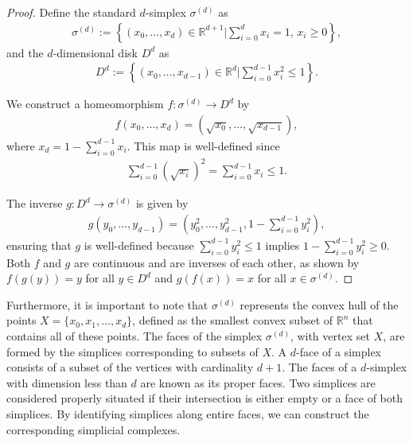 \begin{proof}
	Define the standard \( d \)-simplex \( \sigma^{(d)} \) as
	\begin{align}
		\sigma^{(d)} := \left\{(x_{0}, \ldots, x_{d}) \in \mathbb{R}^{d+1} \bigg\vert \sum_{i=0}^{d} x_{i} = 1, \, x_{i} \geq 0\right\}, 
	\end{align}
	and the \( d \)-dimensional disk \( D^{d} \) as
	\begin{align}
		D^{d} := \left\{(x_{0}, \ldots, x_{d-1}) \in \mathbb{R}^{d} \bigg\vert \sum_{i=0}^{d-1} x_{i}^{2} \leq 1\right\}. 
	\end{align}
					
	We construct a homeomorphism \( f: \sigma^{(d)} \rightarrow D^{d} \) by
	\begin{align}
		f(x_{0}, \ldots, x_{d}) = (\sqrt{x_{0}}, \ldots, \sqrt{x_{d-1}}), 
	\end{align}
	where \( x_{d} = 1 - \sum_{i=0}^{d-1} x_{i} \). This map is well-defined since
	\begin{align}
		\sum_{i=0}^{d-1} (\sqrt{x_{i}})^{2} = \sum_{i=0}^{d-1} x_{i} \leq 1. 
	\end{align}
					
	The inverse \( g: D^{d} \rightarrow \sigma^{(d)} \) is given by
	\begin{align}
		g(y_{0}, \ldots, y_{d-1}) = (y_{0}^{2}, \ldots, y_{d-1}^{2}, 1 - \sum_{i=0}^{d-1} y_{i}^{2}), 
	\end{align}
	ensuring that \( g \) is well-defined because \( \sum_{i=0}^{d-1} y_{i}^{2} \leq 1 \) implies
	\( 1 - \sum_{i=0}^{d-1} y_{i}^{2} \geq 0 \). Both \( f \) and \( g \) are continuous and are inverses of each other, as shown by
	\( f(g(y)) = y \) for all \( y \in D^{d} \) and \( g(f(x)) = x \) for all
	\( x \in \sigma^{(d)} \).
\end{proof}

Furthermore, it is important to note that $\sigma^{(d)}$ represents the convex hull of the points $X = \{x_{0}, x_{1}, \ldots, x_{d}\}$, defined as the smallest convex
subset of $\mathbb{R}^{n}$ that contains all of these points. The faces of the
simplex $\sigma^{(d)}$, with vertex set $X$, are formed by the simplices
corresponding to subsets of $X$. A $d$-face of a simplex consists of a subset of
the vertices with cardinality $d+1$. The faces of a $d$-simplex with dimension
less than $d$ are known as its proper faces. Two simplices
are considered properly situated if their intersection is
either empty or a face of both simplices. By identifying simplices along entire
faces, we can construct the corresponding simplicial complexes.

